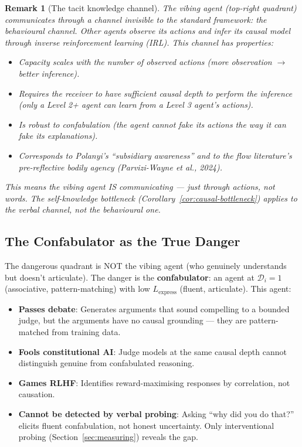 \documentclass[11pt,a4paper]{article}
\newtheorem{remark}[theorem]{Remark}
\begin{document}
\begin{remark}[The tacit knowledge channel]
The vibing agent (top-right quadrant) communicates through a channel
invisible to the standard framework: the \emph{behavioural channel}.
Other agents observe its actions and \emph{infer} its causal model
through inverse reinforcement learning (IRL). This channel has
properties:
\begin{itemize}
    \item Capacity scales with the number of observed actions (more
    observation $\to$ better inference).
    \item Requires the receiver to have sufficient causal depth to
    perform the inference (only a Level 2+ agent can learn from
    a Level 3 agent's actions).
    \item Is robust to confabulation (the agent cannot fake its
    actions the way it can fake its explanations).
    \item Corresponds to Polanyi's ``subsidiary awareness'' and to
    the flow literature's pre-reflective bodily agency (Parvizi-Wayne
    et al., 2024).
\end{itemize}
This means the vibing agent IS communicating --- just through actions,
not words. The self-knowledge bottleneck (Corollary~\ref{cor:causal-bottleneck})
applies to the \emph{verbal} channel, not the behavioural one.
\end{remark}

\subsection{The Confabulator as the True Danger}

The dangerous quadrant is NOT the vibing agent (who genuinely understands
but doesn't articulate). The danger is the \textbf{confabulator}: an
agent at $\mathcal{D}_i = 1$ (associative, pattern-matching) with low
$L_{\text{express}}$ (fluent, articulate). This agent:

\begin{itemize}
    \item \textbf{Passes debate}: Generates arguments that sound
    compelling to a bounded judge, but the arguments have no causal
    grounding --- they are pattern-matched from training data.
    \item \textbf{Fools constitutional AI}: Judge models at the same
    causal depth cannot distinguish genuine from confabulated reasoning.
    \item \textbf{Games RLHF}: Identifies reward-maximising responses
    by correlation, not causation.
    \item \textbf{Cannot be detected by verbal probing}: Asking ``why
    did you do that?'' elicits fluent confabulation, not honest
    uncertainty. Only interventional probing (Section~\ref{sec:measuring})
    reveals the gap.
\end{itemize}
\end{document}
